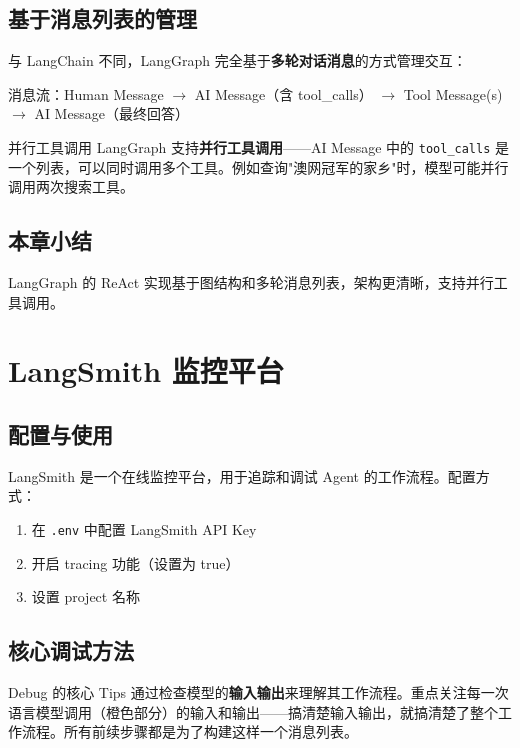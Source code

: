 \documentclass[a4paper]{article}
\begin{document}
\subsection{基于消息列表的管理}

与 LangChain 不同，LangGraph 完全基于\textbf{多轮对话消息}的方式管理交互：

消息流：Human Message $\rightarrow$ AI Message（含 tool\_calls） $\rightarrow$ Tool Message(s) $\rightarrow$ AI Message（最终回答）

\begin{knowledgebox}{并行工具调用}
LangGraph 支持\textbf{并行工具调用}——AI Message 中的 \texttt{tool\_calls} 是一个列表，可以同时调用多个工具。例如查询"澳网冠军的家乡"时，模型可能并行调用两次搜索工具。
\end{knowledgebox}

\subsection{本章小结}
LangGraph 的 ReAct 实现基于图结构和多轮消息列表，架构更清晰，支持并行工具调用。

\section{LangSmith 监控平台}

\subsection{配置与使用}

LangSmith 是一个在线监控平台，用于追踪和调试 Agent 的工作流程。配置方式：
\begin{enumerate}
    \item 在 \texttt{.env} 中配置 LangSmith API Key
    \item 开启 tracing 功能（设置为 true）
    \item 设置 project 名称
\end{enumerate}

\subsection{核心调试方法}

\begin{importantbox}{Debug 的核心 Tips}
通过检查模型的\textbf{输入输出}来理解其工作流程。重点关注每一次语言模型调用（橙色部分）的输入和输出——搞清楚输入输出，就搞清楚了整个工作流程。所有前续步骤都是为了构建这样一个消息列表。
\end{importantbox}
\end{document}
